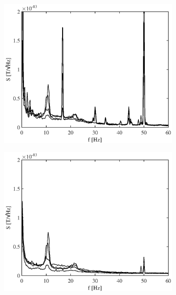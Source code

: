 \documentclass[doc,a4paper,12pt]{apa6}
\begin{document}
\begin{figure}
  \centering
  \captionsetup{justification=centering}
  \begin{subfigure}[c]{0.43\textwidth}
    \includegraphics[width=\textwidth]{ergebnisse/pa07a1_raw_freq.eps}
    \label{img:freq-analy-raw}
  \end{subfigure}\hspace*{0.04\textwidth}
  \begin{subfigure}[c]{0.43\textwidth}
    \includegraphics[width=\textwidth]{ergebnisse/pa07a1_sss_freq.eps}

\end{subfigure}
\end{figure}
\end{document}
